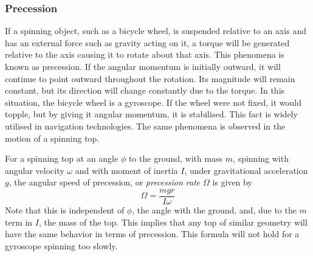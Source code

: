 \documentclass[12pt]{report}
\begin{document}
\begin{flushleft}
\subsubsection*{Precession}
If a spinning object, such as a bicycle wheel, is suspended relative to an axis
and has an external force such as gravity acting on it, a torque will be 
generated relative to the axis causing it to rotate about that axis. This 
phenomena is known as precession. If the angular momentum is initially outward,
it will continue to point outward throughout the rotation. Its magnitude will
remain constant, but its direction will change constantly due to the torque. In
this situation, the bicycle wheel is a gyroscope. If the wheel were not fixed,
it would topple, but by giving it angular momentum, it is stabilised. This 
fact is widely utilised in navigation technologies. The same phenomena is 
observed in the motion of a spinning top.

\bigskip
For a spinning top at an angle \(\phi\) to the ground, with mass \(m\), 
spinning with angular velocity \(\omega\) and with moment of inertia \(I\),
under gravitational acceleration \(g\), the angular speed of precession, or
\textit{precession rate} \(\Omega\) is given by
\[\Omega = \frac{mgr}{I\omega}\]
Note that this is independent of \(\phi\), the angle with the ground, and,
due to the \(m\) term in \(I\), the mass of the top. This implies that any top
of similar geometry will have the same behavior in terms of precession. This 
formula will not hold for a gyroscope spinning too slowly.

\end{flushleft}
\end{document}
